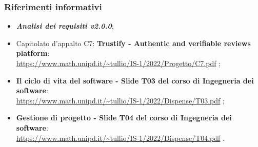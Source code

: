 \subsubsection{Riferimenti informativi}
\begin{itemize}
    \item \textbf{\textit{Analisi dei requisiti v2.0.0}};
    \item Capitolato d'appalto C7: \textbf{Trustify - Authentic and verifiable reviews platform}: \\
          \url{https://www.math.unipd.it/~tullio/IS-1/2022/Progetto/C7.pdf} \hfill{}; %
    \item \textbf{Il ciclo di vita del software - Slide T03 del corso di Ingegneria dei software}: \\
          \url{https://www.math.unipd.it/~tullio/IS-1/2022/Dispense/T03.pdf} \hfill{}; %
    \item \textbf{Gestione di progetto - Slide T04 del corso di Ingegneria dei software}: \\
          \url{https://www.math.unipd.it/~tullio/IS-1/2022/Dispense/T04.pdf} \hfill{}. %
\end{itemize}
